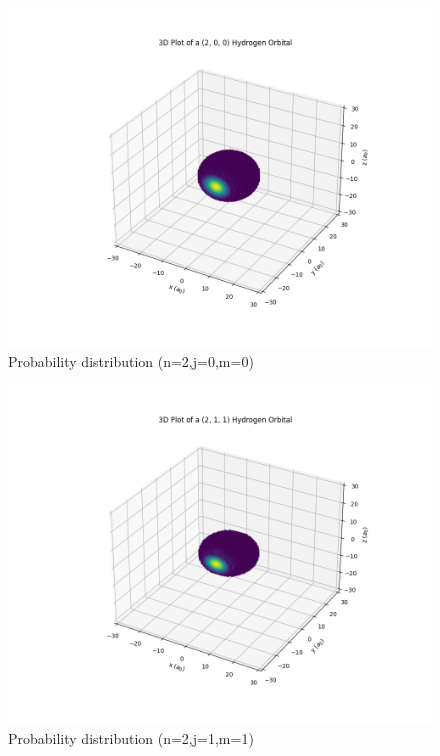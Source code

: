 \begin{figure}
  \centering
  \includegraphics{images9/3d_plot_2,0,0.png}
  \caption{Probability distribution (n=2,j=0,m=0)}
\end{figure}

\begin{figure}
  \centering
  \includegraphics{images9/3d_plot_2,1,1.png}
  \caption{Probability distribution (n=2,j=1,m=1)}
\end{figure}

